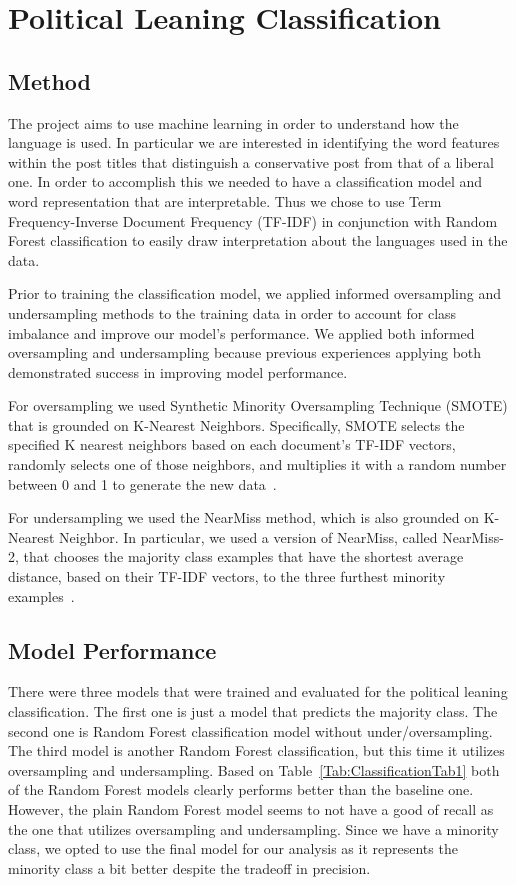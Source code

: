 \documentclass[conference]{IEEEtran}
\begin{document}
\section{Political Leaning Classification}
\subsection{Method}
The project aims to use machine learning in order to understand how the language is used. In particular we are interested in identifying the word features within the post titles that distinguish a conservative post from that of a liberal one. In order to accomplish this we needed to have a classification model and word representation that are interpretable. Thus we chose to use Term Frequency-Inverse Document Frequency (TF-IDF)  in conjunction with Random Forest classification to easily draw interpretation about the languages used in the data.
 
Prior to training the classification model, we applied informed oversampling and undersampling methods to the training data in order to account for class imbalance and improve our model's performance. We applied both informed oversampling and undersampling because previous experiences applying both demonstrated success in improving model performance.
 
For oversampling we used Synthetic Minority Oversampling Technique (SMOTE) that is grounded on K-Nearest Neighbors. Specifically, SMOTE selects the specified K nearest neighbors based on each document's TF-IDF vectors, randomly selects one of those neighbors, and multiplies it with a random number between 0 and 1 to generate the new data~\cite{he2008learning}.
 
For undersampling we used the NearMiss method, which is also grounded on K-Nearest Neighbor. In particular, we used a version of NearMiss, called NearMiss-2, that chooses the majority class examples that have the shortest average distance, based on their TF-IDF vectors, to the three furthest minority examples~\cite{he2008learning}.

\subsection{Model Performance}

There were three models that were trained and evaluated for the political leaning classification. The first one is just a model that predicts the majority class. The second one is Random Forest classification model without under/oversampling. The third model is another Random Forest classification, but this time it utilizes oversampling and undersampling.  Based on Table~\ref{Tab:ClassificationTab1} both of the Random Forest models clearly performs better than the baseline one. However, the plain Random Forest model seems to not have a good of recall as the one that utilizes oversampling and undersampling. Since we have a minority class, we opted to use the final model for our analysis as it represents the minority class a bit better despite the tradeoff in precision.
\end{document}
